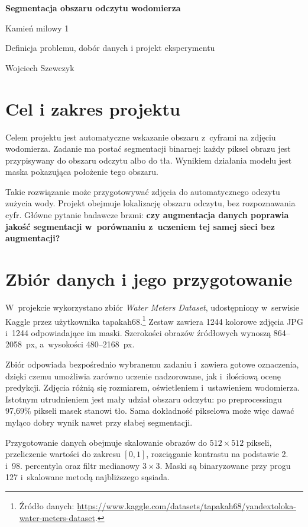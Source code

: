 \documentclass[11pt,a4paper]{article}
\begin{document}
\begin{center}
  {\Large\bfseries Segmentacja obszaru odczytu wodomierza\par}
  \vspace{4pt}
  {\large Kamień milowy 1\par}
  Definicja problemu, dobór danych i projekt eksperymentu\par
  \vspace{5pt}
  Wojciech Szewczyk
\end{center}

\section{Cel i zakres projektu}

Celem projektu jest automatyczne wskazanie obszaru z~cyframi na zdjęciu
wodomierza. Zadanie ma postać segmentacji binarnej: każdy piksel obrazu
jest przypisywany do obszaru odczytu albo do tła. Wynikiem działania modelu
jest maska pokazująca położenie tego obszaru.

Takie rozwiązanie może przygotowywać zdjęcia do automatycznego odczytu
zużycia wody. Projekt obejmuje lokalizację obszaru odczytu, bez rozpoznawania
cyfr. Główne pytanie badawcze brzmi:
\textbf{czy augmentacja danych poprawia jakość segmentacji w~porównaniu
z~uczeniem tej samej sieci bez augmentacji?}

\section{Zbiór danych i jego przygotowanie}

W~projekcie wykorzystano zbiór \textit{Water Meters Dataset}, udostępniony
w~serwisie Kaggle przez użytkownika tapakah68.\footnote{Źródło danych:
\url{https://www.kaggle.com/datasets/tapakah68/yandextoloka-water-meters-dataset}.}
Zestaw zawiera 1244 kolorowe zdjęcia JPG i~1244 odpowiadające im maski.
Szerokości obrazów źródłowych wynoszą 864--2058~px, a~wysokości 480--2168~px.

Zbiór odpowiada bezpośrednio wybranemu zadaniu i~zawiera gotowe oznaczenia,
dzięki czemu umożliwia zarówno uczenie nadzorowane, jak i~ilościową ocenę
predykcji. Zdjęcia różnią się rozmiarem, oświetleniem i~ustawieniem wodomierza.
Istotnym utrudnieniem jest mały udział obszaru odczytu: po preprocessingu
97,69\% pikseli masek stanowi tło. Sama dokładność pikselowa może więc
dawać myląco dobry wynik nawet przy słabej segmentacji.

Przygotowanie danych obejmuje skalowanie obrazów do $512\times512$ pikseli,
przeliczenie wartości do zakresu $[0,1]$, rozciąganie kontrastu na podstawie
2. i~98. percentyla oraz filtr medianowy $3\times3$. Maski są binaryzowane
przy progu 127 i~skalowane metodą najbliższego sąsiada.
\end{document}
